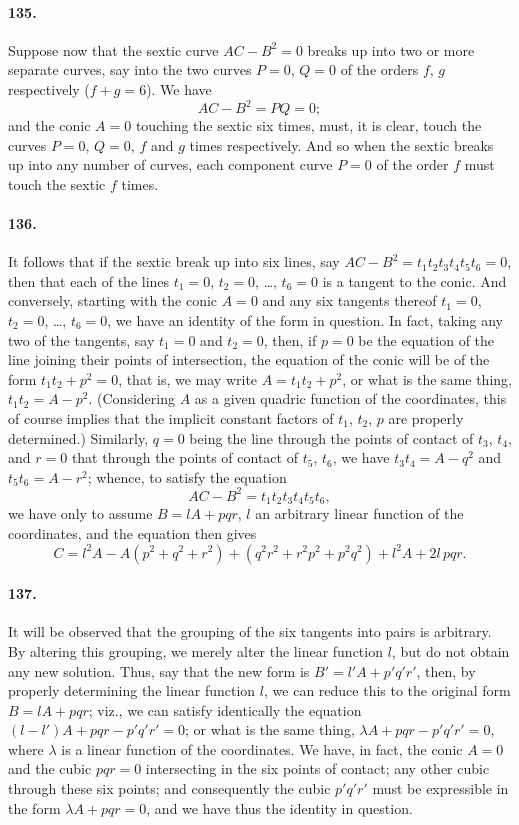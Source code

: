 \documentclass[11pt,a4paper]{article}
\begin{document}
\paragraph{135.}
Suppose now that the sextic curve $AC - B^2 = 0$ breaks up into two or
more separate curves, say into the two curves $P = 0$, $Q = 0$ of the
orders $f$, $g$ respectively ($f + g = 6$). We have
\[
AC - B^2 = PQ = 0;
\]
and the conic $A = 0$ touching the sextic six times, must, it is clear,
touch the curves $P = 0$, $Q = 0$, $f$ and $g$ times respectively. And so
when the sextic breaks up into any number of curves, each component curve
$P = 0$ of the order $f$ must touch the sextic $f$ times.

\paragraph{136.}
It follows that if the sextic break up into six lines, say
$AC - B^2 = t_1 t_2 t_3 t_4 t_5 t_6 = 0$, then that each of the lines
$t_1 = 0$, $t_2 = 0$, \dots, $t_6 = 0$ is a tangent to the conic. And
conversely, starting with the conic $A = 0$ and any six tangents thereof
$t_1 = 0$, $t_2 = 0$, \dots, $t_6 = 0$, we have an identity of the form
in question. In fact, taking any two of the tangents, say $t_1 = 0$ and
$t_2 = 0$, then, if $p = 0$ be the equation of the line joining their
points of intersection, the equation of the conic will be of the form
$t_1 t_2 + p^2 = 0$, that is, we may write $A = t_1 t_2 + p^2$, or what is
the same thing, $t_1 t_2 = A - p^2$. (Considering $A$ as a given quadric
function of the coordinates, this of course implies that the implicit
constant factors of $t_1$, $t_2$, $p$ are properly determined.) Similarly,
$q = 0$ being the line through the points of contact of $t_3$, $t_4$, and
$r = 0$ that through the points of contact of $t_5$, $t_6$, we have
$t_3 t_4 = A - q^2$ and $t_5 t_6 = A - r^2$; whence, to satisfy the
equation
\[
AC - B^2 = t_1 t_2 t_3 t_4 t_5 t_6,
\]
we have only to assume $B = lA + pqr$, $l$ an arbitrary linear function
of the coordinates, and the equation then gives
\[
C = l^2 A - A(p^2 + q^2 + r^2) + (q^2 r^2 + r^2 p^2 + p^2 q^2)
+ l^2 A + 2 l\, pqr.
\]

\paragraph{137.}
It will be observed that the grouping of the six tangents into pairs is
arbitrary. By altering this grouping, we merely alter the linear function
$l$, but do not obtain any new solution. Thus, say that the new form is
$B' = l'A + p' q' r'$, then, by properly determining the linear function
$l$, we can reduce this to the original form $B = lA + pqr$; viz., we can
satisfy identically the equation $(l - l')A + pqr - p'q'r' = 0$; or what
is the same thing, $\lambda A + pqr - p' q' r' = 0$, where $\lambda$ is a
linear function of the coordinates. We have, in fact, the conic $A = 0$
and the cubic $pqr = 0$ intersecting in the six points of contact; any
other cubic through these six points; and consequently the cubic
$p' q' r'$ must be expressible in the form $\lambda A + pqr = 0$, and we
have thus the identity in question.
\end{document}
